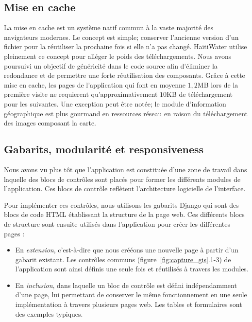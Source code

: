 \documentclass{EPL-master-thesis-covers-FR}
\begin{document}
			\subsection*{Mise en cache}
				\label{sec:cache_client}

				La mise en cache est un système natif commun à la vaste majorité des navigateurs modernes. Le concept est simple; conserver l'ancienne version d'un fichier pour la réutiliser la prochaine fois si elle n'a pas changé. HaïtiWater utilise pleinement ce concept pour alléger le poids des téléchargements. Nous avons poursuivi un objectif de généricité dans le code source afin d'éliminer la redondance et de permettre une forte réutilisation des composants. Grâce à cette mise en cache, les pages de l'application qui font en moyenne $1,2$MB lors de la première visite ne requierent qu'approximativement $10$KB de téléchargement pour les suivantes. Une exception peut être notée; le module d'information géographique est plus gourmand en ressources réseau en raison du téléchargement des images composant la carte.

			\subsection*{Gabarits, modularité et responsiveness}
				Nous avons vu plus tôt que l'application est constituée d'une zone de travail dans laquelle des blocs de contrôles sont placés pour former les différents modules de l'application. Ces blocs de contrôle reflètent l'architecture logicielle de l'interface.

				Pour implémenter ces contrôles, nous utilisons les gabarits Django qui sont des blocs de code HTML établissant la structure de la page web. Ces différents blocs de structure sont ensuite utilisés dans l'application pour créer les différentes pages :
				\begin{itemize}
					\item En \emph{extension}, c'est-à-dire que nous crééons une nouvelle page à partir d'un gabarit existant. Les contrôles communs (figure~\ref{fig:capture_gis}.1-3) de l'application sont ainsi définis une seule fois et réutilisés à travers les modules.
					\item En \emph{inclusion}, dans laquelle un bloc de contrôle est défini indépendamment d'une page, lui permettant de conserver le même fonctionnement en une seule implémentation à travers plusieurs pages web. Les tables et formulaires sont des exemples typiques.
				\end{itemize}
\end{document}
